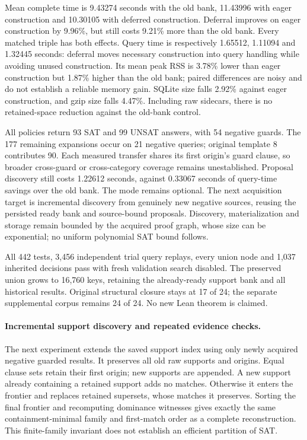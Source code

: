 \documentclass[11pt,a4paper]{article}
\numberwithin{equation}{section}
\theoremstyle{plain}
\theoremstyle{definition}
\theoremstyle{remark}
\begin{document}
Mean complete time is 9.43274 seconds with the old bank, 11.43996 with eager
construction and 10.30105 with deferred construction. Deferral improves on
eager construction by 9.96\%, but still costs 9.21\% more than the old bank.
Every matched triple has both effects. Query time is respectively 1.65512,
1.11094 and 1.32445 seconds: deferral moves necessary construction into query
handling while avoiding unused construction. Its mean peak RSS is 3.78\% lower
than eager construction but 1.87\% higher than the old bank; paired differences
are noisy and do not establish a reliable memory gain. SQLite size falls
2.92\% against eager construction, and gzip size falls 4.47\%. Including raw
sidecars, there is no retained-space reduction against the old-bank control.

All policies return 93 SAT and 99 UNSAT answers, with 54 negative guards. The
177 remaining expansions occur on 21 negative queries; original template 8
contributes 90. Each measured transfer shares its first origin's guard clause,
so broader cross-guard or cross-category coverage remains unestablished.
Proposal discovery still costs 1.22612 seconds, against 0.33067 seconds of
query-time savings over the old bank. The mode remains optional. The next
acquisition target is incremental discovery from genuinely new negative sources,
reusing the persisted ready bank and source-bound proposals. Discovery,
materialization and storage remain bounded by the acquired proof graph, whose
size can be exponential; no uniform polynomial SAT bound follows.

All 442 tests, 3,456 independent trial query replays, every union node and
1,037 inherited decisions pass with fresh validation search disabled. The
preserved union grows to 16,760 keys, retaining the already-ready support bank
and all historical results. Original structural closure stays at 17 of 24;
the separate supplemental corpus remains 24 of 24. No new Lean theorem is claimed.

\paragraph{Incremental support discovery and repeated evidence checks.}
The next experiment extends the saved support index using only newly acquired
negative guarded results. It preserves all old raw supports and origins. Equal
clause sets retain their first origin; new supports are appended. A new support
already containing a retained support adds no matches. Otherwise it enters the
frontier and replaces retained supersets, whose matches it preserves. Sorting
the final frontier and recomputing dominance witnesses gives exactly the same
containment-minimal family and first-match order as a complete reconstruction.
This finite-family invariant does not establish an efficient partition of SAT.
\end{document}
